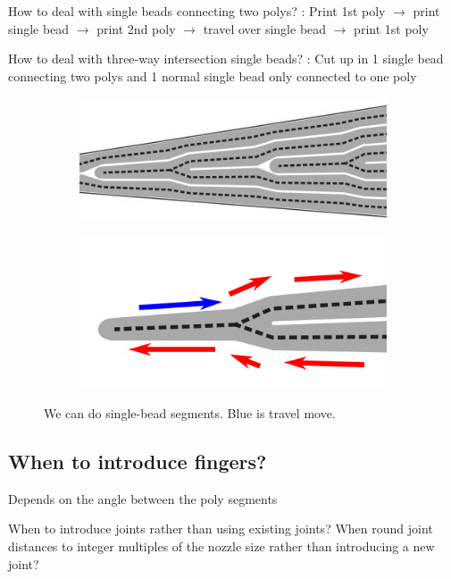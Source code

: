 How to deal with single beads connecting two polys?
: Print 1st poly $\to$ print single bead $\to$ print 2nd poly $\to$ travel over single bead $\to$ print 1st poly

How to deal with three-way intersection single beads?
: Cut up in 1 single bead connecting two polys and 1 normal single bead only connected to one poly

\begin{figure}[H]
\begin{subfigure}{0.45\columnwidth}
\includegraphics[width=\columnwidth]{sources/method/single_bead_strategy.jpg}
\end{subfigure}
\begin{subfigure}{0.45\columnwidth}
\includegraphics[width=\columnwidth]{sources/method/single_bead_strategy_order.jpg}
\end{subfigure}
\caption{We can do single-bead segments. Blue is travel move.}
\label{single_bead_strategy}
\end{figure}


\subsection{When to introduce fingers?}
Depends on the angle between the poly segments

When to introduce joints rather than using existing joints? When round joint distances to integer multiples of the nozzle size rather than introducing a new joint?

